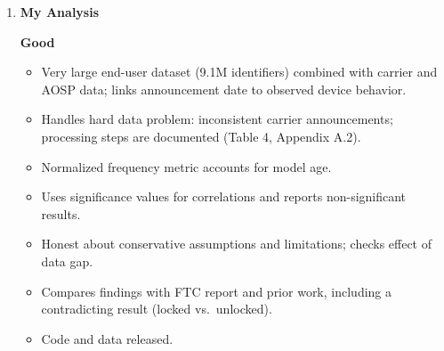 \documentclass[11pt,a4paper]{article}
\newcommand{\entrypart}[1]{\textbf{\color{accent}#1}\par\vspace{2pt}}
\begin{document}
\begin{enumerate}
    \vspace{4pt}
    \textbf{Limitations (authors)}
    \begin{itemize}[leftmargin=*, itemsep=1pt, topsep=2pt]
        \item \textbf{Scope bias:} only the top four U.S. carriers; end-user data mostly U.S. users. Other-country carriers posted limited information.
        \item \textbf{Starting point:} measures only after a patch exists in AOSP. Does not include code-commit delays or chipset vendor delays.
        \item \textbf{Measurement accuracy:}
        \begin{itemize}[itemsep=0pt]
            \item Inconsistent carrier formats; release dates sometimes inferred.
            \item Conservative assumptions: a model could receive more updates than reported.
            \item Update presence inferred from user-agent build numbers; results based on devices where build numbers follow Android convention or the announcement.
        \end{itemize}
        \item \textbf{Model vs.\ device updates:} not all CVEs apply to each model across carriers; ``skipped'' bulletin assumed packaged into a later update.
        \item \textbf{Batch rollout:} no visibility into batch schedule; delay is hard to attribute to user or batch rollout.
        \item \textbf{Black box:} carrier--manufacturer business relationships are not public; findings are empirical observations.
        \item \textbf{User-side data:} timestamps driven by when users open the app; data gap June 11 to July 23, 2019.
    \end{itemize}

    \item \entrypart{My Analysis}

    \textbf{Good}
    \begin{itemize}[leftmargin=*, itemsep=1pt, topsep=2pt]
        \item Very large end-user dataset (9.1M identifiers) combined with carrier and AOSP data; links announcement date to observed device behavior.
        \item Handles hard data problem: inconsistent carrier announcements; processing steps are documented (Table 4, Appendix A.2).
        \item Normalized frequency metric accounts for model age.
        \item Uses significance values for correlations and reports non-significant results.
        \item Honest about conservative assumptions and limitations; checks effect of data gap.
        \item Compares findings with FTC report and prior work, including a contradicting result (locked vs.\ unlocked).
        \item Code and data released.
    \end{itemize}


\end{enumerate}
\end{document}
